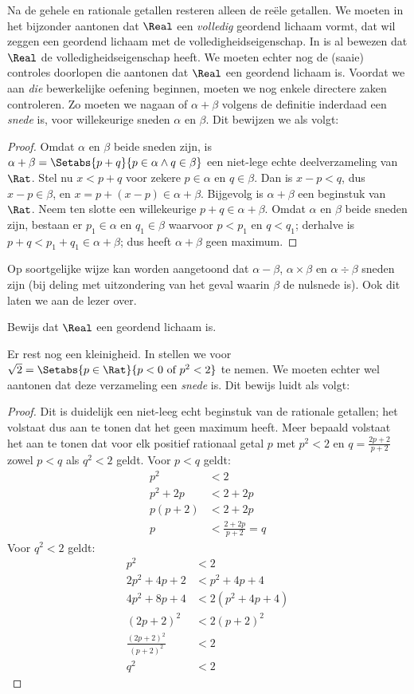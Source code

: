 \documentclass[../../../include/open-logic-section]{subfiles}
\begin{document}
Na de gehele en rationale getallen resteren alleen de reële getallen.
We moeten in het bijzonder aantonen dat $\Real$ een \emph{volledig}
geordend lichaam vormt, dat wil zeggen een geordend lichaam met de
volledigheidseigenschap. In  is al
bewezen dat $\Real$ de volledigheidseigenschap heeft. We moeten echter
nog de (saaie) controles doorlopen die aantonen dat $\Real$ een
geordend lichaam is.
Voordat we aan \emph{die} bewerkelijke oefening beginnen, moeten we
nog enkele directere zaken controleren. Zo moeten we nagaan of
$\alpha + \beta$ volgens de definitie inderdaad een \emph{snede}
is, voor willekeurige sneden $\alpha$ en $\beta$. Dit bewijzen we als
volgt:
\begin{proof}	
Omdat $\alpha$ en $\beta$ beide sneden zijn, is $\alpha + \beta = \Setabs{p
+ q}{p \in \alpha \land q \in \beta}$ een niet-lege echte deelverzameling van
$\Rat$. Stel nu $x < p + q$ voor zekere $p \in \alpha$ en $q \in \beta$.
Dan is $x - p < q$, dus $x - p \in \beta$, en $x = p + (x - p) \in
\alpha + \beta$. Bijgevolg is $\alpha + \beta$ een beginstuk van $\Rat$.
Neem ten slotte een willekeurige $p + q \in \alpha + \beta$. Omdat
$\alpha$ en $\beta$ beide sneden zijn, bestaan er $p_1 \in \alpha$ en $q_1 \in \beta$
waarvoor $p < p_1$ en $q < q_1$; derhalve is $p + q < p_1 + q_1 \in \alpha +
\beta$; dus heeft $\alpha + \beta$ geen maximum.
\end{proof}
Op soortgelijke wijze kan worden aangetoond dat $\alpha - \beta$,
$\alpha \times \beta$ en $\alpha \div \beta$ sneden zijn (bij deling
met uitzondering van het geval waarin $\beta$ de nulsnede is). Ook
dit laten we aan de lezer over.
\begin{prob}
Bewijs dat $\Real$ een geordend lichaam is.
\end{prob}
Er rest nog een kleinigheid. In  stellen we voor
$\sqrt{2} = \Setabs{p \in \Rat}{p < 0 \text{ of }p^2 < 2}$ te nemen.
We moeten echter wel aantonen dat deze verzameling een \emph{snede}
is. Dit bewijs luidt als volgt:
\begin{proof}
Dit is duidelijk een niet-leeg echt beginstuk van de rationale
getallen; het volstaat dus aan te tonen dat het geen maximum heeft.
Meer bepaald volstaat het aan te tonen dat voor elk positief
rationaal getal $p$ met $p^2 < 2$ en $q = \frac{2p+2}{p+2}$ zowel $p
< q$ als $q^2 < 2$ geldt. Voor $p < q$ geldt:
\begin{align*}
	p^2 &< 2\\
	p^2 + 2p &< 2 + 2p\\
	p(p + 2) &< 2 + 2p\\
	p &< \tfrac{2+2p}{p+2} = q
\end{align*}
Voor $q^2 < 2$ geldt:
\begin{align*}
	p^2 &< 2\\
	2p^2 + 4p + 2 &< p^2 + 4p+ 4\\
	4p^2 + 8p + 4 &< 2(p^2 + 4p + 4)\\
	(2p+2)^2 & <2(p+2)^2\\
	\tfrac{(2p+2)^2}{(p+2)^2} &< 2\\
	q^2 &< 2
\end{align*}
\end{proof}
\end{document}
